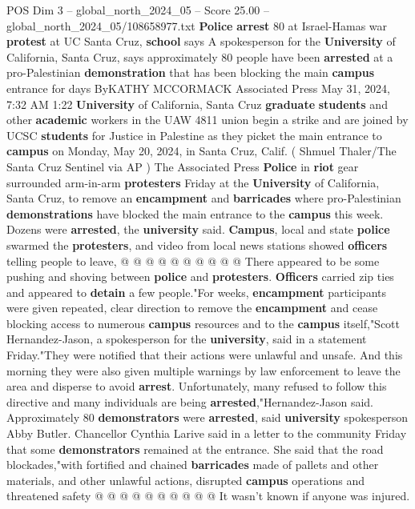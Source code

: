 \begin{textsample}{POS Dim 3 – global\_north\_2024\_05 – Score 25.00 – global\_north\_2024\_05/108658977.txt}  \label{ex:f3_pos_001}
\textbf{Police} \textbf{arrest} 80 at Israel-Hamas war \textbf{protest} at UC Santa Cruz, \textbf{school} says A spokesperson for the \textbf{University} of California, Santa Cruz, says approximately 80 people have been \textbf{arrested} at a pro-Palestinian \textbf{demonstration} that has been blocking the main \textbf{campus} entrance for days ByKATHY MCCORMACK Associated Press May 31, 2024, 7:32 AM 1:22 \textbf{University} of California, Santa Cruz \textbf{graduate} \textbf{students} and other \textbf{academic} workers in the UAW 4811 union begin a strike and are joined by UCSC \textbf{students} for Justice in Palestine as they picket the main entrance to \textbf{campus} on Monday, May 20, 2024, in Santa Cruz, Calif. ( Shmuel Thaler/The Santa Cruz Sentinel via AP ) The Associated Press \textbf{Police} in \textbf{riot} gear surrounded arm-in-arm \textbf{protesters} Friday at the \textbf{University} of California, Santa Cruz, to remove an \textbf{encampment} and \textbf{barricades} where pro-Palestinian \textbf{demonstrations} have blocked the main entrance to the \textbf{campus} this week.
Dozens were \textbf{arrested}, the \textbf{university} said. \textbf{Campus}, local and state \textbf{police} swarmed the \textbf{protesters}, and video from local news stations showed \textbf{officers} telling people to leave, @ @ @ @ @ @ @ @ @ @ There appeared to be some pushing and shoving between \textbf{police} and \textbf{protesters}. \textbf{Officers} carried zip ties and appeared to \textbf{detain} a few people."For weeks, \textbf{encampment} participants were given repeated, clear direction to remove the \textbf{encampment} and cease blocking access to numerous \textbf{campus} resources and to the \textbf{campus} itself,"Scott Hernandez-Jason, a spokesperson for the \textbf{university}, said in a statement Friday."They were notified that their actions were unlawful and unsafe.
And this morning they were also given multiple warnings by law enforcement to leave the area and disperse to avoid \textbf{arrest}.
Unfortunately, many refused to follow this directive and many individuals are being \textbf{arrested},"Hernandez-Jason said.
Approximately 80 \textbf{demonstrators} were \textbf{arrested}, said \textbf{university} spokesperson Abby Butler.
Chancellor Cynthia Larive said in a letter to the community Friday that some \textbf{demonstrators} remained at the entrance.
She said that the road blockades,"with fortified and chained \textbf{barricades} made of pallets and other materials, and other unlawful actions, disrupted \textbf{campus} operations and threatened safety @ @ @ @ @ @ @ @ @ @ It wasn't known if anyone was injured.

\end{textsample}
